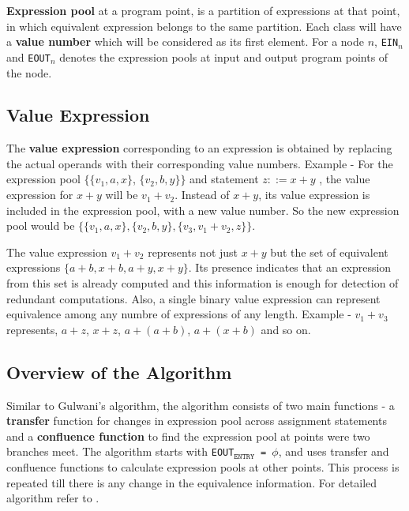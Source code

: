 \textbf{Expression pool} at a program point, is a partition of expressions 
at that point, in which equivalent expression belongs to the same partition. 
Each class will have a \textbf{value number} which will be considered as its 
first element. For a node $n$, \texttt{EIN$_n$} and \texttt{EOUT$_n$} denotes 
the expression pools at input and output program points of the node.

\subsection{Value Expression}
\label{subsec:ValueExpression}
The \textbf{value expression} corresponding to an expression is obtained 
by replacing the actual operands with their corresponding value numbers.
Example - For the expression pool $\{\{v_1, a, x\}$, $\{v_2, b, y \}\}$ 
and statement $z ::= x + y$ , the value expression for $x + y$ will be
$v_1 + v_2$. Instead of $x + y$, its value expression is included in 
the expression pool, with a new value number. So the new expression pool 
would be $\{\{v_1, a, x\},\{v_2, b, y\}, \{v_3, v_1 + v_2, z\}\}$.

The value expression $v_1 + v_2$ represents not just $x + y$ but the
set of equivalent expressions $\{a + b, x + b, a + y, x + y\}$. Its 
presence indicates that an expression from this set is already 
computed and this information is enough for detection of redundant 
computations. Also, a single binary value expression can represent 
equivalence among any numbre of expressions of any length. Example - 
$v_1 + v_3$ represents, $a + z$, $x + z$, $a + (a + b)$, 
$a + (x + b)$ and so on.

\subsection{Overview of the Algorithm}
\label{subsec:OverviewOfTheAlgorithmSaleena}
Similar to Gulwani's algorithm, the algorithm consists of two main 
functions - a \textbf{transfer} function for changes in expression pool 
across assignment statements and a \textbf{confluence function} to find 
the expression pool at points were two branches meet. The algorithm 
starts with \texttt{EOUT$_{\texttt{ENTRY}}$ = $\phi$}, and uses transfer 
and confluence functions to calculate expression pools at other points. 
This process is repeated till there is any change in the equivalence 
information. For detailed algorithm refer to \cite{Saleena}.

